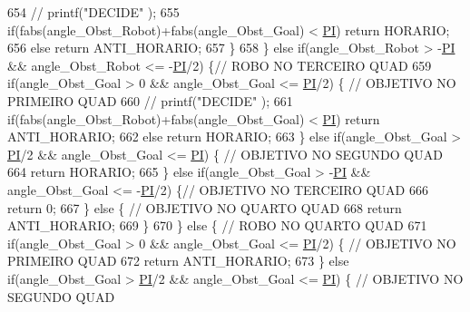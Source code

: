 \begin{DoxyCode}
654             \textcolor{comment}{// printf("DECIDE" );}
655             \textcolor{keywordflow}{if}(fabs(angle\_Obst\_Robot)+fabs(angle\_Obst\_Goal) < \hyperlink{strategy_8cpp_a598a3330b3c21701223ee0ca14316eca}{PI}) \textcolor{keywordflow}{return} HORARIO;
656             \textcolor{keywordflow}{else} \textcolor{keywordflow}{return} ANTI\_HORARIO;
657         \}
658     \} \textcolor{keywordflow}{else} \textcolor{keywordflow}{if}(angle\_Obst\_Robot > -\hyperlink{strategy_8cpp_a598a3330b3c21701223ee0ca14316eca}{PI} && angle\_Obst\_Robot <= -\hyperlink{strategy_8cpp_a598a3330b3c21701223ee0ca14316eca}{PI}/2) \{\textcolor{comment}{// ROBO NO TERCEIRO QUAD}
659         \textcolor{keywordflow}{if}(angle\_Obst\_Goal > 0 && angle\_Obst\_Goal <= \hyperlink{strategy_8cpp_a598a3330b3c21701223ee0ca14316eca}{PI}/2) \{ \textcolor{comment}{// OBJETIVO NO PRIMEIRO QUAD}
660         \textcolor{comment}{//  printf("DECIDE" );}
661             \textcolor{keywordflow}{if}(fabs(angle\_Obst\_Robot)+fabs(angle\_Obst\_Goal) < \hyperlink{strategy_8cpp_a598a3330b3c21701223ee0ca14316eca}{PI}) \textcolor{keywordflow}{return} ANTI\_HORARIO;
662             \textcolor{keywordflow}{else} \textcolor{keywordflow}{return} HORARIO;
663         \} \textcolor{keywordflow}{else} \textcolor{keywordflow}{if}(angle\_Obst\_Goal > \hyperlink{strategy_8cpp_a598a3330b3c21701223ee0ca14316eca}{PI}/2 && angle\_Obst\_Goal <= \hyperlink{strategy_8cpp_a598a3330b3c21701223ee0ca14316eca}{PI}) \{ \textcolor{comment}{// OBJETIVO NO SEGUNDO QUAD}
664             \textcolor{keywordflow}{return} HORARIO;
665         \} \textcolor{keywordflow}{else} \textcolor{keywordflow}{if}(angle\_Obst\_Goal > -\hyperlink{strategy_8cpp_a598a3330b3c21701223ee0ca14316eca}{PI} && angle\_Obst\_Goal <= -\hyperlink{strategy_8cpp_a598a3330b3c21701223ee0ca14316eca}{PI}/2) \{\textcolor{comment}{// OBJETIVO NO TERCEIRO QUAD}
666             \textcolor{keywordflow}{return} 0;
667         \} \textcolor{keywordflow}{else} \{ \textcolor{comment}{// OBJETIVO NO QUARTO QUAD}
668             \textcolor{keywordflow}{return} ANTI\_HORARIO;
669         \}
670     \} \textcolor{keywordflow}{else} \{ \textcolor{comment}{// ROBO NO QUARTO QUAD}
671         \textcolor{keywordflow}{if}(angle\_Obst\_Goal > 0 && angle\_Obst\_Goal <= \hyperlink{strategy_8cpp_a598a3330b3c21701223ee0ca14316eca}{PI}/2) \{ \textcolor{comment}{// OBJETIVO NO PRIMEIRO QUAD}
672             \textcolor{keywordflow}{return} ANTI\_HORARIO;
673         \} \textcolor{keywordflow}{else} \textcolor{keywordflow}{if}(angle\_Obst\_Goal > \hyperlink{strategy_8cpp_a598a3330b3c21701223ee0ca14316eca}{PI}/2 && angle\_Obst\_Goal <= \hyperlink{strategy_8cpp_a598a3330b3c21701223ee0ca14316eca}{PI}) \{ \textcolor{comment}{// OBJETIVO NO SEGUNDO QUAD}

\end{DoxyCode}
